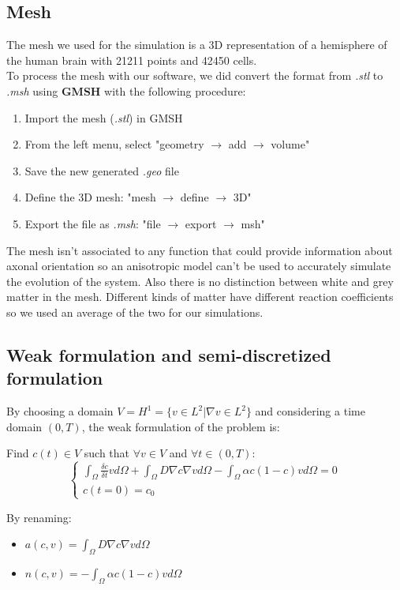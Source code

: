 \documentclass[12pt, letterpaper]{article}
\begin{document}
\subsection{Mesh}
The mesh we used for the simulation is a 3D representation of a hemisphere of the human brain with 21211 points and 42450 cells.\\
To process the mesh with our software, we did convert the format from \textit{.stl} to \textit{.msh} using \textbf{GMSH} with the following procedure:
\begin{enumerate}
    \item Import the mesh (\textit{.stl}) in GMSH
    \item From the left menu, select "geometry $\rightarrow$ add $\rightarrow$ volume"
    \item Save the new generated \textit{.geo} file
    \item Define the 3D mesh: "mesh $\rightarrow$ define $\rightarrow$ 3D"
    \item Export the file as \textit{.msh}: "file $\rightarrow$ export $\rightarrow$ msh"
\end{enumerate}

\noindent The mesh isn't associated to any function that could provide information about axonal orientation so an anisotropic model can't be used to accurately simulate the evolution of the system.
\noindent Also there is no distinction between white and grey matter in the mesh. Different kinds of matter have different reaction coefficients so we used an average of the two for our simulations. 

\subsection{Weak formulation and semi-discretized formulation}
By choosing a domain $V=H^1=\{v\in L^2|\nabla v\in L^2\}$ and considering a time domain $(0, T)$, the weak formulation of the problem is:

\vspace{1em}
\noindent Find $c(t)\in V$ such that $\forall v\in V$ and $\forall t\in(0,T)$:
$$\begin{cases}\int_\Omega\frac{\delta c}{\delta t}vd\Omega+\int_\Omega D\nabla c\nabla vd\Omega-\int_\Omega\alpha c(1-c)vd\Omega=0\\c(t=0)=c_0\end{cases}$$

\vspace{1em}
\noindent By renaming:
\begin{itemize}
    \item $a(c,v)=\int_\Omega D\nabla c\nabla vd\Omega$
    \item $n(c,v)=-\int_\Omega\alpha c(1-c)vd\Omega$
\end{itemize}
\end{document}
